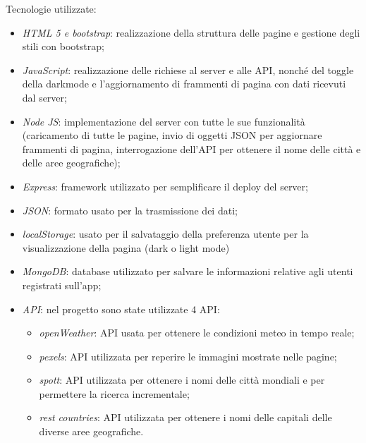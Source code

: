Tecnologie utilizzate:
\begin{itemize}
    \item \emph{HTML 5 e bootstrap}: realizzazione della struttura delle pagine e gestione degli stili con bootstrap;
    \item \emph{JavaScript}: realizzazione delle richiese al server e alle API, nonché del toggle della darkmode e l'aggiornamento
          di frammenti di pagina con dati ricevuti dal server;
    \item \emph{Node JS}: implementazione del server con tutte le sue funzionalità (caricamento di tutte le pagine,
          invio di oggetti JSON per aggiornare frammenti di pagina, interrogazione dell'API per ottenere il nome delle città e delle
          aree geografiche);
    \item \emph{Express}: framework utilizzato per semplificare il deploy del server;
    \item \emph{JSON}: formato usato per la trasmissione dei dati;
    \item \emph{localStorage}: usato per il salvataggio della preferenza utente per la visualizzazione della pagina (dark o light mode)
    \item \emph{MongoDB}: database utilizzato per salvare le informazioni relative agli utenti registrati sull'app;
    \item \emph{API}: nel progetto sono state utilizzate 4 API:
          \begin{itemize}
              \item \emph{openWeather}: API usata per ottenere le condizioni meteo in tempo reale;
              \item \emph{pexels}: API utilizzata per reperire le immagini mostrate nelle pagine;
              \item \emph{spott}: API utilizzata per ottenere i nomi delle città mondiali e per permettere la ricerca incrementale;
              \item \emph{rest countries}: API utilizzata per ottenere i nomi delle capitali delle diverse aree geografiche.
          \end{itemize}
\end{itemize}